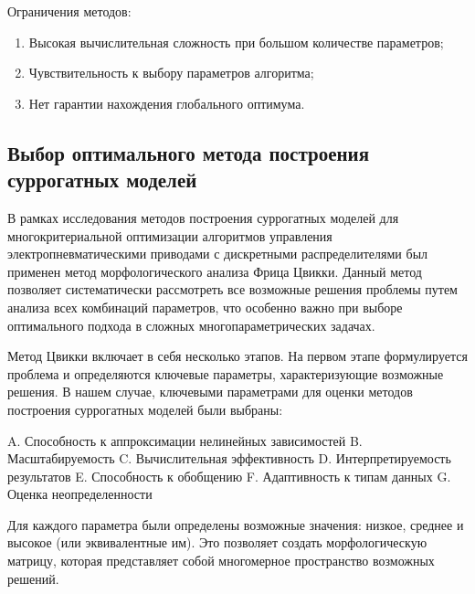 Ограничения методов:
\begin{enumerate}
    \item Высокая вычислительная сложность при большом количестве параметров;
    \item Чувствительность к выбору параметров алгоритма;
    \item Нет гарантии нахождения глобального оптимума.
\end{enumerate}

\subsection{Выбор оптимального метода построения суррогатных моделей}\label{sec:ch4/sec2/subsec2}

В рамках исследования методов построения суррогатных моделей
для многокритериальной оптимизации алгоритмов управления
электропневматическими приводами с дискретными распределителями
был применен метод морфологического анализа Фрица Цвикки. Данный
метод позволяет систематически рассмотреть все возможные решения
проблемы путем анализа всех комбинаций параметров, что особенно важно
при выборе оптимального подхода в сложных многопараметрических задачах.

Метод Цвикки включает в себя несколько этапов. На первом этапе
формулируется проблема и определяются ключевые параметры,
характеризующие возможные решения. В нашем случае, ключевыми
параметрами для оценки методов построения суррогатных моделей были выбраны:

A. Способность к аппроксимации нелинейных зависимостей
B. Масштабируемость
C. Вычислительная эффективность
D. Интерпретируемость результатов
E. Способность к обобщению
F. Адаптивность к типам данных
G. Оценка неопределенности

Для каждого параметра были определены возможные значения:
низкое, среднее и высокое (или эквивалентные им).
Это позволяет создать морфологическую матрицу,
которая представляет собой многомерное пространство возможных решений.

